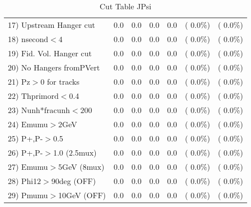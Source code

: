 \begin{table}[h!]
\begin{tabular}{||l||r|r|r|r|r|r||}
 17) Upstream Hanger cut  &          0.0 &          0.0 &          0.0 &          0.0 & (  0.0\%) & (  0.0\%) \\
 18) nsecond$<$4          &          0.0 &          0.0 &          0.0 &          0.0 & (  0.0\%) & (  0.0\%) \\
 19) Fid. Vol. Hanger cut &          0.0 &          0.0 &          0.0 &          0.0 & (  0.0\%) & (  0.0\%) \\
 20) No Hangers fromPVert &          0.0 &          0.0 &          0.0 &          0.0 & (  0.0\%) & (  0.0\%) \\
 21) Pz$>$0 for tracks    &          0.0 &          0.0 &          0.0 &          0.0 & (  0.0\%) & (  0.0\%) \\
 22) Thprimord$<$0.4      &          0.0 &          0.0 &          0.0 &          0.0 & (  0.0\%) & (  0.0\%) \\
 23) Nunh*fracunh$<$200   &          0.0 &          0.0 &          0.0 &          0.0 & (  0.0\%) & (  0.0\%) \\
 24) Emumu$>$2GeV         &          0.0 &          0.0 &          0.0 &          0.0 & (  0.0\%) & (  0.0\%) \\
 25) P+,P-$>$0.5          &          0.0 &          0.0 &          0.0 &          0.0 & (  0.0\%) & (  0.0\%) \\
 26) P+,P-$>$1.0 (2.5mux) &          0.0 &          0.0 &          0.0 &          0.0 & (  0.0\%) & (  0.0\%) \\
 27) Emumu$>$5GeV  (8mux) &          0.0 &          0.0 &          0.0 &          0.0 & (  0.0\%) & (  0.0\%) \\
 28) Phi12$>$90deg  (OFF) &          0.0 &          0.0 &          0.0 &          0.0 & (  0.0\%) & (  0.0\%) \\
 29) Pmumu$>$10GeV  (OFF) &          0.0 &          0.0 &          0.0 &          0.0 & (  0.0\%) & (  0.0\%) \\
 \hline
 \hline
 \end{tabular}
 \caption{Cut Table  JPsi     }
 \label{tab-cutcohjpsi-mumu_cohrhop}
 \end{table}
